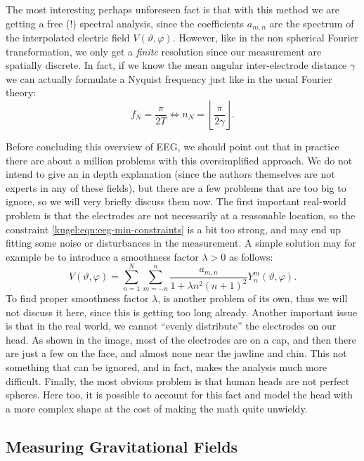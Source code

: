 The most interesting perhaps unforeseen fact is that with this method we are
getting a free (!) spectral analysis, since the coefficients $a_{m,n}$ are the
spectrum of the interpolated electric field $V(\vartheta, \varphi)$. However,
like in the non spherical Fourier transformation, we only get a \emph{finite}
resolution since our measurement are spatially discrete. In fact, if we know the
mean angular inter-electrode distance $\gamma$ we can actually formulate a
Nyquist frequency just like in the usual Fourier theory:
\begin{equation}
  f_N = \frac{\pi}{2T}
  \iff
  n_N = \left\lfloor \frac{\pi}{2\gamma} \right\rfloor.
\end{equation}

Before concluding this overview of EEG, we should point out that in practice
there are about a million problems with this oversimplified approach. We do not
intend to give an in depth explanation (since the authors themselves are not
experts in any of these fields), but there are a few problems that are too big
to ignore, so we will very briefly discuss them now. The first important
real-world problem is that the electrodes are not necessarily at a reasonable
location, so the constraint \eqref{kugel:eqn:eeg-min-constraints} is a bit too
strong, and may end up fitting some noise or disturbances in the measurement. A
simple solution may for example be to introduce a smoothness factor $\lambda >
0$ as follows:
\begin{equation}
  V(\vartheta, \varphi) = \sum_{n=1}^N \sum_{m=-n}^n 
    \frac{a_{m,n}}{1 + \lambda n^2(n+1)^2} Y^m_n(\vartheta, \varphi).
\end{equation}
To find proper smoothness factor $\lambda$, is another problem of its own, thus
we will not discuss it here, since this is getting too long already. Another
important issue is that in the real world, we cannot ``evenly distribute'' the
electrodes on our head. As shown in the image, most of the electrodes are on a
cap, and then there are just a few on the face, and almost none near the jawline
and chin. This not something that can be ignored, and in fact, makes the
analysis much more difficult. Finally, the most obvious problem is that human
heads are not perfect spheres. Here too, it is possible to account for this fact
and model the head with a more complex shape at the cost of making the math
quite unwieldy.

\subsection{Measuring Gravitational Fields}

